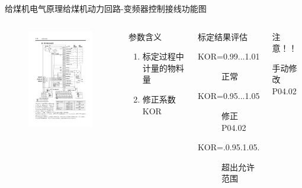 \documentclass[12pt,hyperref={CJKbookmarks=true}]{beamer} %
\begin{document}
\begin{frame}{给煤机电气原理}{给煤机动力回路-变频器控制接线功能图}
  		\begin{columns}
\begin{figure}
\includegraphics[angle=0,width=150pt,trim=10 50 0 80,clip]{1.pdf}
	
\end{figure}
\begin{block}{参数含义}
			\begin{enumerate}
				\item 标定过程中计量的物料量
				\item  修正系数KOR
				\end{enumerate}
\end{block}
\begin{exampleblock}{标定结果评估}
			\begin{description}
				\item[KOR=0.99...1.01]正常
				\item[KOR=0.95...1.05]修正P04.02
				\item[KOR=.0.95.1.05.]超出允许范围
				\end{description}
\end{exampleblock}
\begin{alertblock}{注意！！}
			
				手动修改P04.02
\end{alertblock}
		\end{columns}
	\end{frame}
\end{document}
